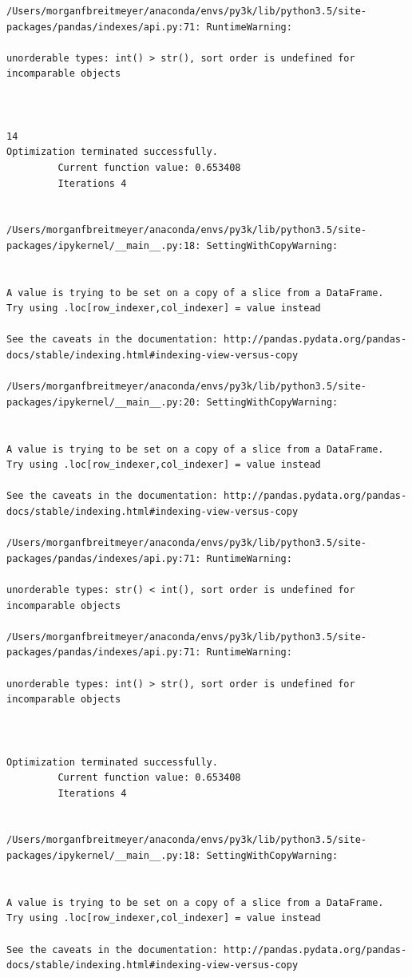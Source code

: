 \begin{lstlisting}
/Users/morganfbreitmeyer/anaconda/envs/py3k/lib/python3.5/site-packages/pandas/indexes/api.py:71: RuntimeWarning:

unorderable types: int() > str(), sort order is undefined for incomparable objects



14
Optimization terminated successfully.
         Current function value: 0.653408
         Iterations 4


/Users/morganfbreitmeyer/anaconda/envs/py3k/lib/python3.5/site-packages/ipykernel/__main__.py:18: SettingWithCopyWarning:


A value is trying to be set on a copy of a slice from a DataFrame.
Try using .loc[row_indexer,col_indexer] = value instead

See the caveats in the documentation: http://pandas.pydata.org/pandas-docs/stable/indexing.html#indexing-view-versus-copy

/Users/morganfbreitmeyer/anaconda/envs/py3k/lib/python3.5/site-packages/ipykernel/__main__.py:20: SettingWithCopyWarning:


A value is trying to be set on a copy of a slice from a DataFrame.
Try using .loc[row_indexer,col_indexer] = value instead

See the caveats in the documentation: http://pandas.pydata.org/pandas-docs/stable/indexing.html#indexing-view-versus-copy

/Users/morganfbreitmeyer/anaconda/envs/py3k/lib/python3.5/site-packages/pandas/indexes/api.py:71: RuntimeWarning:

unorderable types: str() < int(), sort order is undefined for incomparable objects

/Users/morganfbreitmeyer/anaconda/envs/py3k/lib/python3.5/site-packages/pandas/indexes/api.py:71: RuntimeWarning:

unorderable types: int() > str(), sort order is undefined for incomparable objects



Optimization terminated successfully.
         Current function value: 0.653408
         Iterations 4


/Users/morganfbreitmeyer/anaconda/envs/py3k/lib/python3.5/site-packages/ipykernel/__main__.py:18: SettingWithCopyWarning:


A value is trying to be set on a copy of a slice from a DataFrame.
Try using .loc[row_indexer,col_indexer] = value instead

See the caveats in the documentation: http://pandas.pydata.org/pandas-docs/stable/indexing.html#indexing-view-versus-copy


\end{lstlisting}
